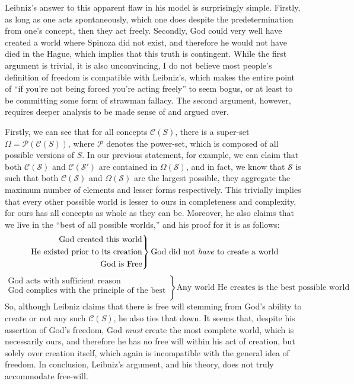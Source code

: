 \documentclass[12pt,letterpaper]{article}
\begin{document}
    Leibniz's answer to this apparent flaw in his model is surprisingly simple. Firstly, as long as one acts spontaneously, which one does despite the predetermination from one's concept, then they act freely. Secondly, God could very well have created a world where Spinoza did not exist, and therefore he would not have died in the Hague, which implies that this truth is contingent. While the first argument is trivial, it is also unconvincing, I do not believe most people's definition of freedom is compatible with Leibniz’s, which makes the entire point of ``if you're not being forced you're acting freely'' to seem bogus, or at least to be committing some form of strawman fallacy. The second argument, however, requires deeper analysis to be made sense of and argued over.

    Firstly, we can see that for all concepts \(\mathcal C(S)\), there is a super-set \(\Omega = \mathcal P(\mathcal C(S))\), where \(\mathcal P\) denotes the power-set, which is composed of all possible versions of \(S\). In our previous statement, for example, we can claim that both \(\mathcal C(\mathcal S)\) and \(\mathcal C(\mathcal S')\) are contained in \(\Omega(\mathcal S)\), and in fact, we know that \(\mathcal S\) is such that both \(\mathcal C(\mathcal S)\) and \(\Omega(\mathcal S)\) are the largest possible, they aggregate the maximum number of elements and lesser forms respectively. This trivially implies that every other possible world is lesser to ours in completeness and complexity, for ours has all concepts as whole as they can be. Moreover, he also claims that we live in the ``best of all possible worlds,'' and his proof for it is as follows:
    \begin{equation*}
        \left.\begin{aligned}
               \text{God created this world} \\
               \text{He existed prior to its creation}\\
               \text{God is Free}\\
              \end{aligned}
        \right \}
        \text{God did not \emph{have} to create a world}
    \end{equation*}
    \begin{equation*}
        \left.\begin{aligned}
            \text{God acts with sufficient reason} \\
            \text{God complies with the principle of the best}\\
           \end{aligned}
     \right \}
     \text{Any world He creates is the best possible world}
    \end{equation*}
    So, although Leibniz claims that there is free will stemming from God's ability to create or not any such \(\mathcal C(S)\), he also ties that down. It seems that, despite his assertion of God's freedom, God \emph{must} create the most complete world, which is necessarily ours, and therefore he has no free will within his act of creation, but solely over creation itself, which again is incompatible with the general idea of freedom. In conclusion, Leibniz's argument, and his theory, does not truly accommodate free-will.
\end{document}
